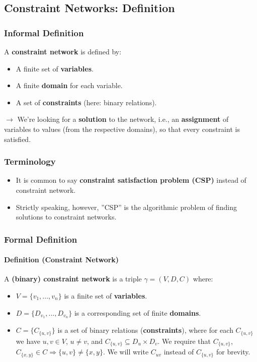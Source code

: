 \documentclass[conference]{styles/acmsiggraph}
\newcommand\subsubsubsection{\paragraph}
\begin{document}
    
    \subsection{Constraint Networks: Definition}
        \subsubsection{Informal Definition}
            A \textbf{constraint network} is defined by:
            \begin{itemize}
                \item A finite set of \textbf{variables}.
                \item A finite \textbf{domain} for each variable.
                \item A set of \textbf{constraints} (here: binary relations).
            \end{itemize}
            
            $\rightarrow$ We're looking for a \textbf{solution} to the network, i.e., an \textbf{assignment} of variables to values (from the respective domains), so that every constraint is satisfied.
            
        \subsubsection{Terminology}
            \begin{itemize}
                \item It is common to say \textbf{constraint satisfaction problem (CSP)} instead of constraint network.
                \item Strictly speaking, however, ''CSP'' is the algorithmic problem of finding solutions to constraint networks.
            \end{itemize}
                
        \subsubsection{Formal Definition}
            \subsubsubsection{Definition (Constraint Network)}
                A \textbf{(binary) constraint network} is a triple $\gamma = (V,D,C)$ where:
                    \begin{itemize}
                        \item $V = \{v_1,...,v_n\}$ is a finite set of \textbf{variables}.
                        \item $D = \{D_{v_1},...,D_{v_n}\}$ is a corresponding set of finite \textbf{domains}.
                        \item $C = \{C_{\{u,v\}}\}$ is a set of binary relations (\textbf{constraints}), where for each $C_{\{u,v\}}$ we have $u,v \in V$, $u \neq v$, and $C_{\{u,v\}} \subseteq D_u \times D_v$.
                        We require that $C_{\{u,v\}}$, $C_{\{x,y\}} \in C \Rightarrow \{u,v\} \neq \{x,y\}$.\newline
                        We will write $C_{uv}$ instead of $C_{\{u,v\}}$ for brevity.
                    \end{itemize}
            
\end{document}
